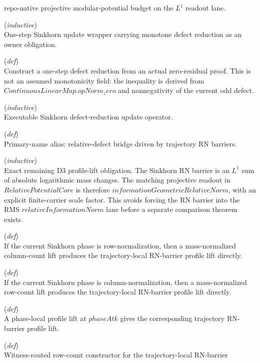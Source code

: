 \documentclass[11pt,a4paper]{article}
\begin{document}
\begin{description}
repo-native projective modular-potential budget on the $L^1 $ readout lane.
  \item[\texttt{SinkhornDefectStep}] (\textit{inductive}) \\ One-step Sinkhorn update wrapper carrying monotone defect reduction as an owner 
obligation.
  \item[\texttt{of\_routerResidual\_eq\_zero}] (\textit{def}) \\ Construct a one-step defect reduction from an actual zero-residual proof. 
This is not an assumed monotonicity field: the inequality is derived from 
$ContinuousLinearMap.opNorm_zero$ and nonnegativity of the current odd defect.
  \item[\texttt{SinkhornDefectUpdate}] (\textit{inductive}) \\ Executable Sinkhorn defect-reduction update operator.
  \item[\texttt{SinkhornRelativeDefectBridge}] (\textit{def}) \\ Primary-name alias: relative-defect bridge driven by trajectory RN barriers.
  \item[\texttt{SinkhornRNBarrierProfileLift}] (\textit{inductive}) \\ Exact remaining D3 profile-lift obligation. 
The Sinkhorn RN barrier is an $L^1 $ sum of absolute logarithmic mass changes. 
The matching projective readout in $RelativePotentialCore$ is therefore 
$informationGeometricRelativeNorm$, with an explicit finite-carrier scale 
factor. This avoids forcing the RN barrier into the RMS 
$relativeInformationNorm$ lane before a separate comparison theorem exists.
  \item[\texttt{ofMassNormalizedColCounts}] (\textit{def}) \\ If the current Sinkhorn phase is row-normalization, then a mass-normalized 
column-count lift produces the trajectory-local RN-barrier profile lift 
directly.
  \item[\texttt{ofMassNormalizedRowCounts}] (\textit{def}) \\ If the current Sinkhorn phase is column-normalization, then a mass-normalized 
row-count lift produces the trajectory-local RN-barrier profile lift directly.
  \item[\texttt{ofPhase}] (\textit{def}) \\ A phase-local profile lift at $phaseAt k$ gives the corresponding trajectory 
RN-barrier profile lift.
  \item[\texttt{ofRowCountMassNormalizedWitness}] (\textit{def}) \\ Witness-routed row-count constructor for the trajectory-local RN-barrier 

\end{description}
\end{document}
